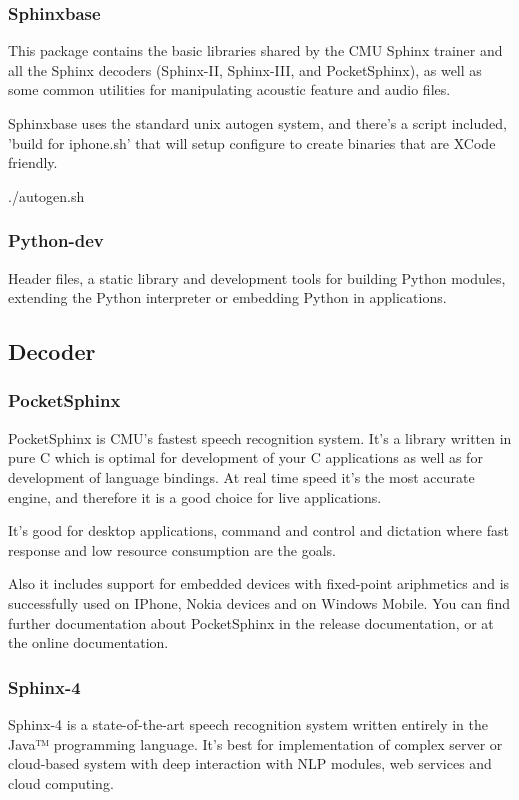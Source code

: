 \documentclass[12pt,a4paper,oldfontcommands]{memoir}
\begin{document}
\subsubsection{Sphinxbase}
This package contains the basic libraries shared by the CMU Sphinx
trainer and all the Sphinx decoders (Sphinx-II, Sphinx-III, and
PocketSphinx), as well as some common utilities for manipulating
acoustic feature and audio files.

Sphinxbase uses the standard unix autogen system, and there's a script
included, 'build for iphone.sh' that will setup configure to create
binaries that are XCode friendly.

 ./autogen.sh

\subsubsection{Python-dev}
Header files, a static library and development tools for building
 Python modules, extending the Python interpreter or embedding Python
 in applications\cite{14}.

\subsection{Decoder}
\subsubsection{PocketSphinx}
 PocketSphinx is CMU’s fastest speech recognition system. It’s a library written in pure C which is optimal for development of your C applications as well as for development of language bindings. At real time speed it’s the most accurate engine, and therefore it is a good choice for live applications.

It's good for desktop applications, command and control and dictation where fast response and low resource consumption are the goals.

Also it includes support for embedded devices with fixed-point ariphmetics and is successfully used on IPhone, Nokia devices and on Windows Mobile. You can find further documentation about PocketSphinx in the release documentation, or at the online  documentation\cite{5}. 

\subsubsection{Sphinx-4}
Sphinx-4 is a state-of-the-art speech recognition system written entirely in the Java™ programming language. It's best for implementation of complex server or cloud-based system with deep interaction with NLP modules, web services and cloud computing\cite{5}.
\end{document}
